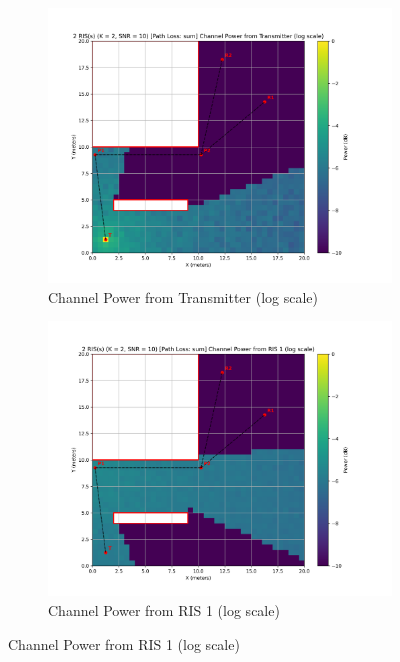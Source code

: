 \begin{figure}[H]
\begin{subfigure}[b]{0.48\textwidth}
    \includegraphics[width=\textwidth]{imgs/heatmap-simulations/2 RIS(s) (K = 2, SNR = 10) [Path Loss_ sum] Channel Power from Transmitter (log scale).png}
    \caption{Channel Power from Transmitter (log scale)}
  \end{subfigure}
  \medskip
  \centering
  \begin{subfigure}[b]{0.48\textwidth}
    \centering
    \includegraphics[width=\textwidth]{imgs/heatmap-simulations/2 RIS(s) (K = 2, SNR = 10) [Path Loss_ sum] Channel Power from RIS 1 (log scale).png}
    \caption{Channel Power from RIS 1 (log scale)}
  \end{subfigure}

\end{figure}
